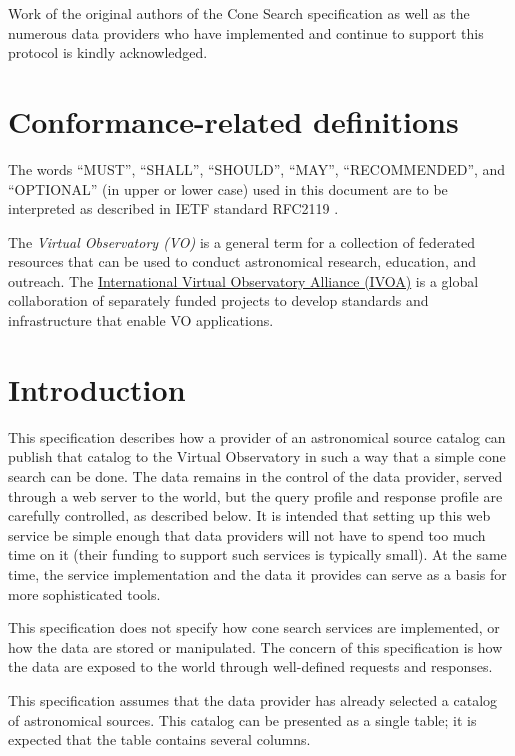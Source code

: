 \documentclass[11pt,a4paper]{ivoa}
\begin{document}
Work of the original authors of the Cone Search specification as well as
the numerous data providers who have implemented and continue to support
this protocol is kindly acknowledged.

\section*{Conformance-related definitions}

The words ``MUST'', ``SHALL'', ``SHOULD'', ``MAY'', ``RECOMMENDED'', and
``OPTIONAL'' (in upper or lower case) used in this document are to be
interpreted as described in IETF standard RFC2119 \citep{std:RFC2119}.

The \emph{Virtual Observatory (VO)} is a general term for a collection
of federated resources that can be used to conduct astronomical
research, education, and outreach.  The
\href{http://www.ivoa.net}{International Virtual Observatory Alliance
(IVOA)} is a global collaboration of separately funded projects to
develop standards and infrastructure that enable VO applications.


\section{Introduction}

This specification describes how a provider of an astronomical source
catalog can publish that catalog to the Virtual Observatory in such a
way that a simple cone search can be done. The data remains in the
control of the data provider, served through a web server to the world,
but the query profile and response profile are carefully controlled, as
described below. It is intended that setting up this web service be
simple enough that data providers will not have to spend too much time
on it (their funding to support such services is typically small). At
the same time, the service implementation and the data it provides can
serve as a basis for more sophisticated tools.

This specification does not specify how cone search services are
implemented, or how the data are stored or manipulated. The concern of
this specification is how the data are exposed to the world through
well-defined requests and responses.

This specification assumes that the data provider has already selected a
catalog of astronomical sources. This catalog can be presented as a
single table; it is expected that the table contains several columns.
\end{document}
